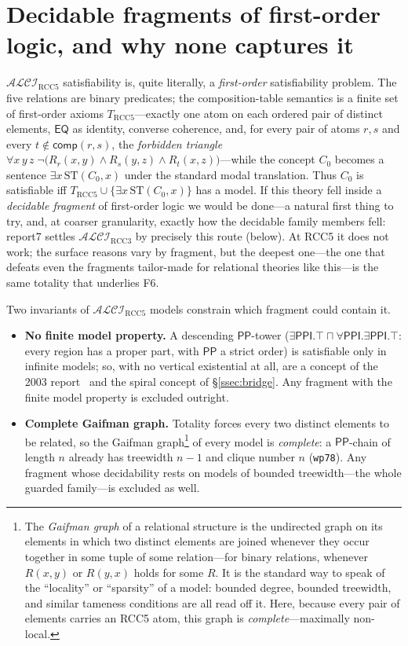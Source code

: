 \documentclass[11pt]{article}
\newcommand{\ALCIRCC}[1]{\mathcal{ALCI}_{\mathrm{RCC#1}}}
\newcommand{\PP}{\mathsf{PP}}
\newcommand{\PPI}{\mathsf{PPI}}
\newcommand{\EQ}{\mathsf{EQ}}
\newcommand{\comp}{\ensuremath{\mathsf{comp}}}
\theoremstyle{plain}
\theoremstyle{definition}
\begin{document}

\section{Decidable fragments of first-order logic, and why none captures it}
\label{sec:fofragments}

$\ALCIRCC{5}$ satisfiability is, quite literally, a \emph{first-order}
satisfiability problem. The five relations are binary predicates; the
composition-table semantics is a finite set of first-order axioms
$T_{\mathrm{RCC5}}$---exactly one atom on each ordered pair of distinct
elements, $\EQ$ as identity, converse coherence, and, for every pair of atoms
$r,s$ and every $t\notin\comp(r,s)$, the \emph{forbidden triangle}
$\forall x\,y\,z\;\neg\bigl(R_r(x,y)\wedge R_s(y,z)\wedge R_t(x,z)\bigr)$---while
the concept $C_0$ becomes a sentence $\exists x\,\mathrm{ST}(C_0,x)$ under the
standard modal translation. Thus $C_0$ is satisfiable iff
$T_{\mathrm{RCC5}}\cup\{\exists x\,\mathrm{ST}(C_0,x)\}$ has a model. If this
theory fell inside a \emph{decidable fragment} of first-order logic we would
be done---a natural first thing to try, and, at coarser granularity, exactly
how the decidable family members fell: report7 settles $\ALCIRCC3$ by
precisely this route (below). At RCC5 it does not work; the surface reasons
vary by fragment, but the deepest one---the one that defeats even the
fragments tailor-made for relational theories like this---is the same
totality that underlies F6.

Two invariants of $\ALCIRCC{5}$ models constrain which fragment could contain
it.
\begin{itemize}
  \item \textbf{No finite model property.} A descending $\PP$-tower
    ($\exists\PPI.\top\sqcap\forall\PPI.\exists\PPI.\top$: every region has a
    proper part, with $\PP$ a strict order) is satisfiable only in infinite
    models; so, with no vertical existential at all, are a concept of the
    2003 report~\cite[\S5.2]{Wessel2003} and the spiral concept of
    \S\ref{ssec:bridge}. Any fragment with the finite model property is
    excluded outright.
  \item \textbf{Complete Gaifman graph.} Totality forces every two distinct
    elements to be related, so the Gaifman graph\footnote{The \emph{Gaifman
    graph} of a relational structure is the undirected graph on its elements
    in which two distinct elements are joined whenever they occur together in
    some tuple of some relation---for binary relations, whenever $R(x,y)$ or
    $R(y,x)$ holds for some $R$. It is the standard way to speak of the
    ``locality'' or ``sparsity'' of a model: bounded degree, bounded
    treewidth, and similar tameness conditions are all read off it. Here,
    because every pair of elements carries an RCC5 atom, this graph is
    \emph{complete}---maximally non-local.} of every model is
    \emph{complete}: a $\PP$-chain of length $n$ already has treewidth $n-1$
    and clique number $n$ (\texttt{wp78}). Any fragment whose decidability
    rests on models of bounded treewidth---the whole guarded family---is
    excluded as well.
\end{itemize}
\end{document}
